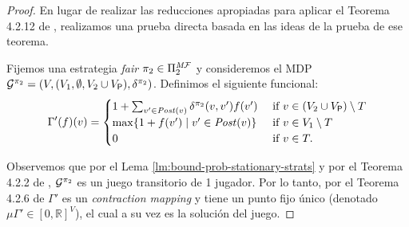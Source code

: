 \begin{proof}
  En lugar de realizar las reducciones apropiadas para aplicar el Teorema 4.2.12 de \cite[p.~174]{FilarV96}, realizamos una prueba directa basada en las ideas
  de la prueba de ese teorema.
  
  Fijemos una estrategia \emph{fair} $\pi_{2} \in \Pi^{\textit{M}\mathcal{F}}_{2}$ y
  consideremos el MDP
  $\mathcal{G}^{\pi_{2}} = (V, (V_1, \emptyset, V_2 \cup V_{\mathsf{P}}), \delta^{\pi_{2}})$.
  Definimos el siguiente funcional:
  \[
  \Gamma'(f)(v) =
  \begin{cases}
    1 + \sum_{v' \in \mathit{Post}(v)} \delta^{\pi_{2}}(v,v')  f(v') & \text{ if } v \in (V_2 \cup V_{\mathsf{P}}) \setminus T  \\
    \max \{1  + f(v') \mid v' \in \mathit{Post}(v) \} & \text{ if } v \in  V_1 \setminus T \\
    0 & \text{ if } v \in T.
  \end{cases}
  \]
  
  Observemos que por el Lema \ref{lm:bound-prob-stationary-strats} y por el Teorema 4.2.2 de \cite{FilarV96},  $\mathcal{G}^{\pi_{2}}$
  es un juego transitorio de 1 jugador. Por lo tanto, por el Teorema 4.2.6 de \cite{FilarV96} $\Gamma'$ es un \textit{contraction mapping} y tiene un punto fijo único (denotado $\mu \Gamma' \in [0,\mathbb{R}]^V$), el cual a su vez es la solución del juego.
  

\end{proof}
